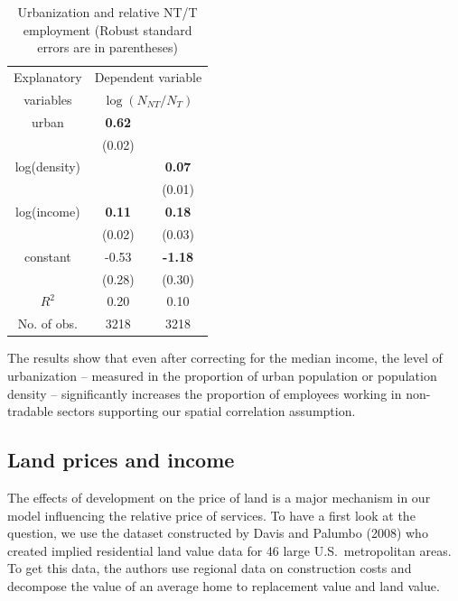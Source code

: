 \documentclass[12pt]{article}
\begin{document}
\begin{table}[h!]
\center \caption{Urbanization and relative NT/T employment (Robust
standard errors are in parentheses)}
\begin{tabular}{c|cc}
  \hline\hline
  Explanatory & \multicolumn{2}{c}{Dependent variable} \\
  variables & \multicolumn{2}{c}{$\log (N_{NT}/N_T)$} \\ \hline
  urban         & \textbf{0.62} &  \\
                & (0.02)        &  \\
  log(density)  &               & \textbf{0.07} \\
                &               & (0.01) \\
  log(income)   & \textbf{0.11} & \textbf{0.18} \\
                & (0.02)        & (0.03) \\
  constant      & -0.53         & \textbf{-1.18} \\
                & (0.28)        & (0.30) \\ \hline
  $R^2$         & 0.20          & 0.10 \\
  No. of obs.   & 3218          & 3218 \\ \hline\hline
\end{tabular}
\end{table}

The results show that even after correcting for the median income,
the level of urbanization -- measured in the proportion of urban
population or population density -- significantly increases the
proportion of employees working in non-tradable sectors supporting
our spatial correlation assumption.

\subsection{Land prices and income}
The effects of development on the price of land is a major mechanism
in our model influencing the relative price of services. To have a
first look at the question, we use the dataset constructed by Davis and
Palumbo (2008) who created implied residential land value data for 46
large U.S.~metropolitan areas. To get this data, the authors use
regional data on construction costs and decompose the value of an
average home to replacement value and land value.
\end{document}
